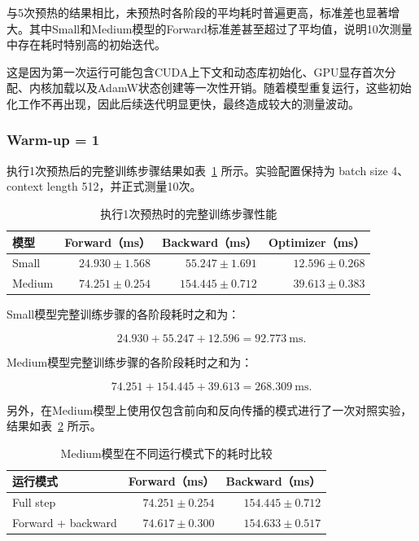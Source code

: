 \documentclass[12pt]{ctexart}
\begin{document}
与5次预热的结果相比，未预热时各阶段的平均耗时普遍更高，标准差也显著增大。其中Small和Medium模型的Forward标准差甚至超过了平均值，说明10次测量中存在耗时特别高的初始迭代。

这是因为第一次运行可能包含CUDA上下文和动态库初始化、GPU显存首次分配、内核加载以及AdamW状态创建等一次性开销。随着模型重复运行，这些初始化工作不再出现，因此后续迭代明显更快，最终造成较大的测量波动。

\subsubsection{Warm-up = 1}

执行1次预热后的完整训练步骤结果如表~\ref{tab:warmup-one} 所示。实验配置保持为 batch size 4、context length 512，并正式测量10次。

\begin{table}[htbp]
    \centering
    \caption{执行1次预热时的完整训练步骤性能}
    \label{tab:warmup-one}
    \begin{tabular}{lrrr}
        \toprule
        模型 &
        Forward（ms） &
        Backward（ms） &
        Optimizer（ms） \\
        \midrule
        Small
        & $24.930 \pm 1.568$
        & $55.247 \pm 1.691$
        & $12.596 \pm 0.268$ \\

        Medium
        & $74.251 \pm 0.254$
        & $154.445 \pm 0.712$
        & $39.613 \pm 0.383$ \\
        \bottomrule
    \end{tabular}
\end{table}

Small模型完整训练步骤的各阶段耗时之和为：

\[
24.930 + 55.247 + 12.596
= 92.773\ \text{ms}.
\]

Medium模型完整训练步骤的各阶段耗时之和为：

\[
74.251 + 154.445 + 39.613
= 268.309\ \text{ms}.
\]

另外，在Medium模型上使用仅包含前向和反向传播的模式进行了一次对照实验，结果如表~\ref{tab:warmup-one-mode-comparison} 所示。

\begin{table}[htbp]
    \centering
    \caption{Medium模型在不同运行模式下的耗时比较}
    \label{tab:warmup-one-mode-comparison}
    \begin{tabular}{lrr}
        \toprule
        运行模式 & Forward（ms） & Backward（ms） \\
        \midrule
        Full step
        & $74.251 \pm 0.254$
        & $154.445 \pm 0.712$ \\

        Forward + backward
        & $74.617 \pm 0.300$
        & $154.633 \pm 0.517$ \\
        \bottomrule
    \end{tabular}
\end{table}
\end{document}
